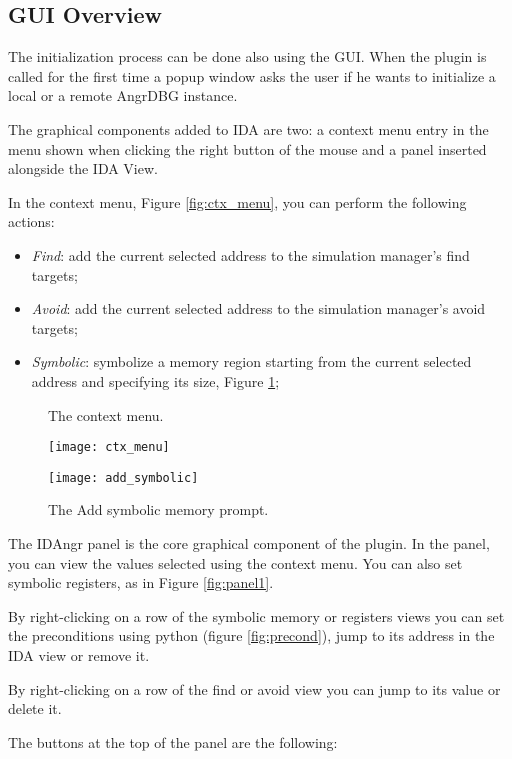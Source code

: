 \subsection{GUI Overview}

The initialization process can be done also using the GUI. When the plugin is called for the first time a popup window asks the user if he wants to initialize a local or a remote AngrDBG instance.

The graphical components added to IDA are two: a context menu entry in the menu shown when clicking the right button of the mouse and a panel inserted alongside the IDA View.

In the context menu, Figure \ref{fig:ctx_menu}, you can perform the following actions:

\begin{itemize}
\item {\em Find}: add the current selected address to the simulation manager's find targets;
\item {\em Avoid}: add the current selected address to the simulation manager's avoid targets;
\item {\em Symbolic}: symbolize a memory region starting from the current selected address and specifying its size, Figure \ref{fig:add_symbolic};
\end{itemize}

\begin{figure}
    \centering
    \parbox{5cm}{
        \caption{The context menu.}
        \texttt{[image: ctx\_menu]}
        \label{fig:ctx_menu}
    }
    \qquad
    \begin{minipage}{5cm}
    \caption{The Add symbolic memory prompt.}
    \texttt{[image: add\_symbolic]}
    \label{fig:add_symbolic}
    \end{minipage}
\end{figure}

The IDAngr panel is the core graphical component of the plugin. In the panel, you can view the values selected using the context menu. You can also set symbolic registers, as in Figure \ref{fig:panel1}.

By right-clicking on a row of the symbolic memory or registers views you can set the preconditions using python (figure \ref{fig:precond}), jump to its address in the IDA view or remove it.

By right-clicking on a row of the find or avoid view you can jump to its value or delete it.

The buttons at the top of the panel are the following:

